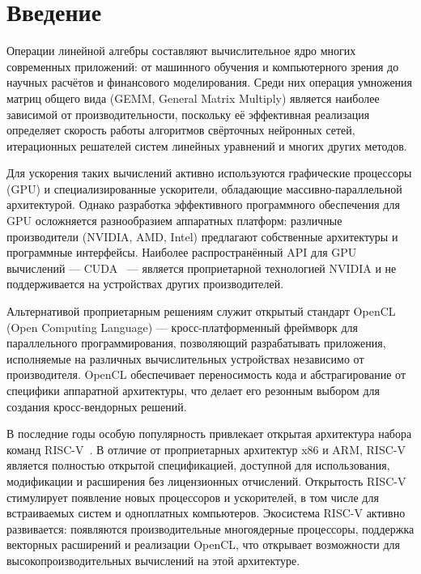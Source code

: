 
\section*{Введение}
\thispagestyle{withCompileDate}

Операции линейной алгебры составляют вычислительное ядро многих современных приложений: от машинного обучения и компьютерного зрения до научных расчётов и финансового моделирования. Среди них операция умножения матриц общего вида (GEMM, General Matrix Multiply) является наиболее зависимой от производительности, поскольку её эффективная реализация определяет скорость работы алгоритмов свёрточных нейронных сетей, итерационных решателей систем линейных уравнений и многих других методов.

Для ускорения таких вычислений активно используются графические процессоры (GPU) и специализированные ускорители, обладающие массивно-параллельной архитектурой. Однако разработка эффективного программного обеспечения для GPU осложняется разнообразием аппаратных платформ: различные производители (NVIDIA, AMD, Intel) предлагают собственные архитектуры и программные интерфейсы. Наиболее распространённый API для GPU вычислений --- CUDA~\cite{nickolls2008cuda} --- является проприетарной технологией NVIDIA и не поддерживается на устройствах других производителей.

Альтернативой проприетарным решениям служит открытый стандарт OpenCL~\cite{opencl_spec} (Open Computing Language) --- кросс-платформенный фреймворк для параллельного программирования, позволяющий разрабатывать приложения, исполняемые на различных вычислительных устройствах независимо от производителя. OpenCL обеспечивает переносимость кода и абстрагирование от специфики аппаратной архитектуры, что делает его резонным выбором для создания кросс-вендорных решений.

В последние годы особую популярность привлекает открытая архитектура набора команд RISC-V~\cite{waterman2014risc}. В отличие от проприетарных архитектур x86 и ARM, RISC-V является полностью открытой спецификацией, доступной для использования, модификации и расширения без лицензионных отчислений. Открытость RISC-V стимулирует появление новых процессоров и ускорителей, в том числе для встраиваемых систем и одноплатных компьютеров. Экосистема RISC-V активно развивается: появляются производительные многоядерные процессоры, поддержка векторных расширений и реализации OpenCL, что открывает возможности для высокопроизводительных вычислений на этой архитектуре.

